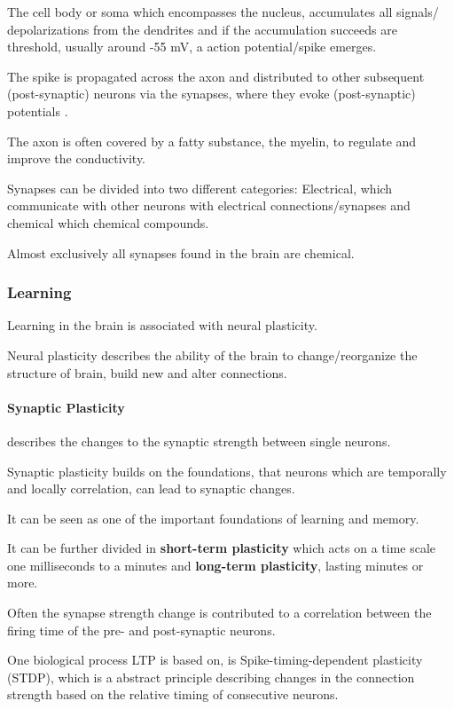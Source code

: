 The cell body or soma which encompasses the nucleus, accumulates all signals/ depolarizations from the dendrites and if the accumulation succeeds are threshold, usually around -55 mV, a action potential/spike emerges.

The spike is propagated across the axon and distributed to other subsequent (post-synaptic) neurons via the synapses, where they evoke (post-synaptic) potentials .

The axon is often covered by a fatty substance, the myelin, to regulate and improve the conductivity.

Synapses can be divided into two different categories: Electrical, which communicate with other neurons with electrical connections/synapses and chemical which chemical compounds.

Almost exclusively all synapses found in the brain are chemical.

\subsubsection{Learning}

Learning in the brain is associated with neural plasticity.

Neural plasticity describes the ability of the brain to change/reorganize the structure of brain, build new and alter connections.  

\paragraph{Synaptic Plasticity} describes the changes to the synaptic strength between single neurons. 

Synaptic plasticity builds on the foundations, that neurons which are temporally and locally correlation, can lead to synaptic changes.

It can be seen as one of the important foundations of learning and memory.

It can be further divided in \textbf{short-term plasticity} which acts on a time scale one milliseconds to a minutes and \textbf{long-term plasticity}, lasting minutes or more.

Often the synapse strength change is contributed to a correlation between the firing time of the pre- and post-synaptic neurons.

One biological process LTP is based on, is Spike-timing-dependent plasticity (STDP), which is a abstract principle describing changes in the connection strength based on the relative timing of consecutive neurons.


